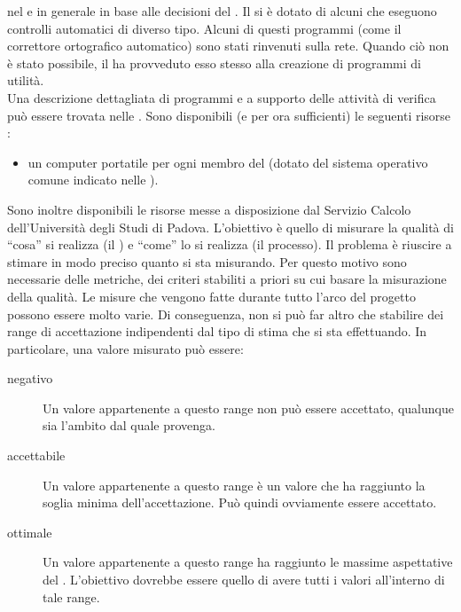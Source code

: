 					nel  e in generale in base alle decisioni del .
					Il  si è dotato di alcuni  che eseguono controlli automatici di diverso tipo. Alcuni di questi programmi (come il 
					correttore ortografico automatico) sono stati rinvenuti sulla rete. Quando ciò non è stato possibile, il  ha provveduto esso 
					stesso alla creazione di programmi di utilità.\\
					Una descrizione dettagliata di programmi e  a supporto delle attività di verifica può essere trovata nelle .
					Sono disponibili (e per ora sufficienti) le seguenti risorse :
					\begin{itemize}
						\item un computer portatile per ogni membro del  (dotato del sistema operativo comune indicato nelle ).
					\end{itemize}
					Sono inoltre disponibili le risorse  messe a disposizione dal Servizio Calcolo dell'Università degli Studi di Padova.
		 \label{sec:metriche}
			L'obiettivo è quello di misurare la qualità di “cosa” si realizza (il ) e “come” lo si realizza (il processo). Il problema è 
			riuscire a stimare in modo preciso quanto si sta misurando. Per questo motivo sono necessarie delle metriche, dei criteri stabiliti a 
			priori su cui basare la misurazione della qualità.
				Le misure che vengono fatte durante tutto l'arco del progetto possono essere molto varie. Di conseguenza, non si può far altro che 
				stabilire dei range di accettazione indipendenti dal tipo di stima che si sta effettuando. In particolare, una valore misurato può 
				essere:
				\begin{description}
					\item[negativo] Un valore appartenente a questo range non può essere accettato, qualunque sia l'ambito dal quale provenga.
					\item[accettabile] Un valore appartenente a questo range è un valore che ha raggiunto la soglia minima dell'accettazione. Può 
					quindi ovviamente essere accettato.
					\item[ottimale] Un valore appartenente a questo range ha raggiunto le massime aspettative del . L'obiettivo dovrebbe essere 
					quello di avere tutti i valori all'interno di tale range.
				\end{description}
